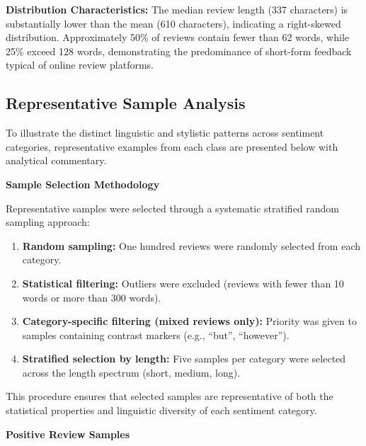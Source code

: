 \textbf{Distribution Characteristics:}  
The median review length (337 characters) is substantially lower than the mean (610 characters), indicating a right-skewed distribution. Approximately 50\% of reviews contain fewer than 62 words, while 25\% exceed 128 words, demonstrating the predominance of short-form feedback typical of online review platforms.

\subsection{Representative Sample Analysis}

To illustrate the distinct linguistic and stylistic patterns across sentiment categories, representative examples from each class are presented below with analytical commentary.

\textbf{Sample Selection Methodology}

Representative samples were selected through a systematic stratified random sampling approach:
\begin{enumerate}
    \item \textbf{Random sampling:} One hundred reviews were randomly selected from each category.
    \item \textbf{Statistical filtering:} Outliers were excluded (reviews with fewer than 10 words or more than 300 words).
    \item \textbf{Category-specific filtering (mixed reviews only):} Priority was given to samples containing contrast markers (e.g., ``but'', ``however'').
    \item \textbf{Stratified selection by length:} Five samples per category were selected across the length spectrum (short, medium, long).
\end{enumerate}

This procedure ensures that selected samples are representative of both the statistical properties and linguistic diversity of each sentiment category.

\textbf{Positive Review Samples}

